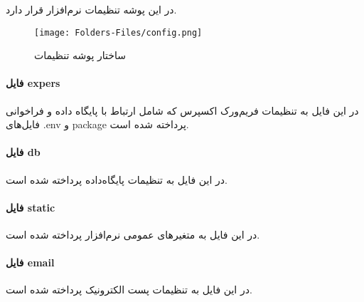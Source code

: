 در این پوشه تنظیمات نرم‌افزار قرار دارد. 

\begin{figure}[H]
	\texttt{[image: Folders-Files/config.png]}
	\centering
	\caption{ساختار پوشه تنظیمات}
	\label{fig:folder-config}
\end{figure}

\paragraph{فایل expers}
در این فایل به تنظیمات فریم‌ورک اکسپرس که شامل ارتباط با پایگاه داده و فراخوانی فایل‌های .env و package پرداخته شده است. 

\paragraph{فایل db}
در این فایل به تنظیمات پایگاه‌داده پرداخته شده است. 

\paragraph{فایل static}
در این فایل به متغیرهای عمومی نرم‌افزار پرداخته شده است.
 
\paragraph{فایل email}
در این فایل به تنظیمات پست الکترونیک پرداخته شده است. 
